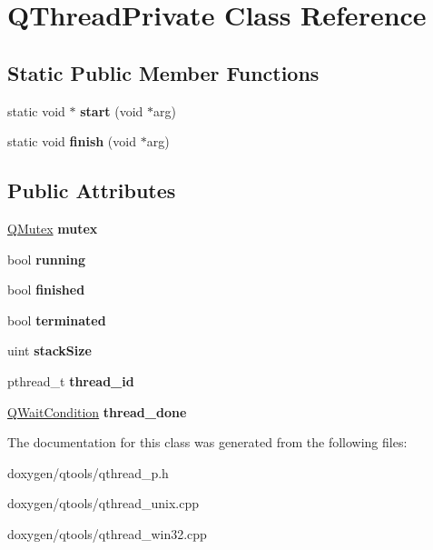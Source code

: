\hypertarget{class_q_thread_private}{}\section{Q\+Thread\+Private Class Reference}
\label{class_q_thread_private}
\subsection*{Static Public Member Functions}
\begin{DoxyCompactItemize}
\item 
\mbox{\label{class_q_thread_private_ab7ed40bba5929f954506e78cd1107949}} 
static void $\ast$ {\bfseries start} (void $\ast$arg)
\item 
\mbox{\label{class_q_thread_private_a9352e719b7ffaebe586caffac7df2ce5}} 
static void {\bfseries finish} (void $\ast$arg)
\end{DoxyCompactItemize}
\subsection*{Public Attributes}
\begin{DoxyCompactItemize}
\item 
\mbox{\label{class_q_thread_private_a7eda287dec112d2d5ae6e3ab1f1e87a7}} 
\mbox{\hyperlink{class_q_mutex}{Q\+Mutex}} {\bfseries mutex}
\item 
\mbox{\label{class_q_thread_private_ac96f01bd5deeef951778d772aaa07809}} 
bool {\bfseries running}
\item 
\mbox{\label{class_q_thread_private_aafd7888a95ed3d66521d36e703fbd417}} 
bool {\bfseries finished}
\item 
\mbox{\label{class_q_thread_private_af4814bc64bcadcaf0c148a0c0e5923f8}} 
bool {\bfseries terminated}
\item 
\mbox{\label{class_q_thread_private_a7a278caba71183f61e4a11c3d0e89a12}} 
uint {\bfseries stack\+Size}
\item 
\mbox{\label{class_q_thread_private_a149ec58cdf120de1c55fdccd0e108325}} 
pthread\+\_\+t {\bfseries thread\+\_\+id}
\item 
\mbox{\label{class_q_thread_private_a812ec2aaef47ea81521066b641f9ae05}} 
\mbox{\hyperlink{class_q_wait_condition}{Q\+Wait\+Condition}} {\bfseries thread\+\_\+done}
\end{DoxyCompactItemize}


The documentation for this class was generated from the following files\+:\begin{DoxyCompactItemize}
\item 
doxygen/qtools/qthread\+\_\+p.\+h\item 
doxygen/qtools/qthread\+\_\+unix.\+cpp\item 
doxygen/qtools/qthread\+\_\+win32.\+cpp\end{DoxyCompactItemize}
